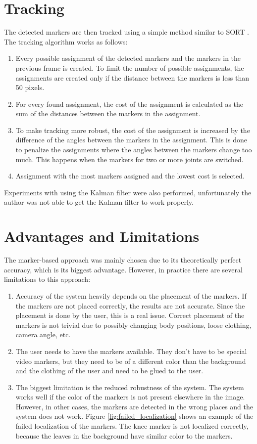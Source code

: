 \section{Tracking}
\label{tracking}
The detected markers are then tracked using a simple method similar to SORT \cite{sort}. The tracking algorithm works as follows:

\begin{enumerate}
    \item Every possible assignment of the detected markers and the markers in the previous frame is created. To limit the number of possible assignments, the assignments are created only if the distance between the markers is less than 50 pixels.
    \item For every found assignment, the cost of the assignment is calculated as the sum of the distances between the markers in the assignment.
    \item To make tracking more robust, the cost of the assignment is increased by the difference of the angles between the markers in the assignment. This is done to penalize the assignments where the angles between the markers change too much. This happens when the markers for two or more joints are switched.
    \item Assignment with the most markers assigned and the lowest cost is selected.
\end{enumerate}

Experiments with using the Kalman filter were also performed, unfortunately the author was not able to get the Kalman filter to work properly.

\section{Advantages and Limitations}
The marker-based approach was mainly chosen due to its theoretically perfect accuracy, which is
its biggest advantage. However, in practice there are several limitations to this approach:

\begin{enumerate}
    \item Accuracy of the system heavily depends on the placement of the markers. If the markers are not placed correctly, the results are not accurate. Since the placement is done by the user, this is a real issue. Correct placement of the markers is not trivial due to possibly changing body positions, loose clothing, camera angle, etc.
    \item The user needs to have the markers available. They don't have to be special video markers, but they need to be of a different color than the background and the clothing of the user and need to be glued to the user.
    \item The biggest limitation is the reduced robustness of the system. The system works well if the color of the markers is not present elsewhere in the image. However, in other cases, the markers are detected in the wrong places and the system does not work. Figure \ref{fig:failed_localization} shows an example of the failed localization of the markers. The knee marker is not localized correctly, because the leaves in the background have similar color to the markers.
\end{enumerate}

